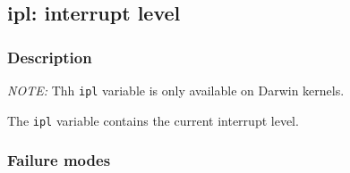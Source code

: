 \clearpage
{}
{}
\label{vars:ipl}
\subsection*{ipl: interrupt level}

\subsubsection*{Description}

\emph{NOTE:} Thh \verb|ipl| variable is only available on Darwin
kernels.

The \verb|ipl| variable contains the current interrupt level.

\subsubsection*{Failure modes}

